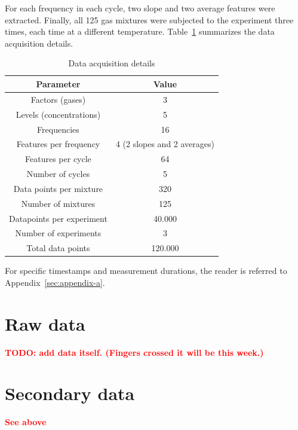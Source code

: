For each frequency in each cycle, two slope and two average features were extracted. Finally, all 125 gas mixtures were subjected to the experiment three times, each time at a different temperature. Table~\ref{tab:measurements} summarizes the data acquisition details.

\begin{table}[h]
	\centering
	\begin{tabular}{|c|c|}
		\hline
		\textbf{Parameter} & \textbf{Value} \\
		\hline
		Factors (gases) & 3 \\
		\hline
		Levels (concentrations) & 5 \\
		\hline
		Frequencies & 16 \\
		\hline
		Features per frequency & 4 (2 slopes and 2 averages) \\
		\hline
		Features per cycle & 64 \\
		\hline
		Number of cycles & 5 \\
		\hline
		Data points per mixture & 320 \\
		\hline
		Number of mixtures & 125 \\
		\hline
		Datapoints per experiment & 40.000 \\
		\hline
		Number of experiments & 3 \\
		\hline
		Total data points & 120.000 \\
		\hline
	\end{tabular}
\caption{Data acquisition details}
\label{tab:measurements}
\end{table}

For specific timestamps and measurement durations, the reader is referred to Appendix~\ref{sec:appendix-a}.

\section{Raw data}
\label{sec:raw-data}

\textbf{\textcolor{red}{TODO: add data itself. (Fingers crossed it will be this week.)}}

\section{Secondary data}
\label{sec:secondary-data}

\textbf{\textcolor{red}{See above}}